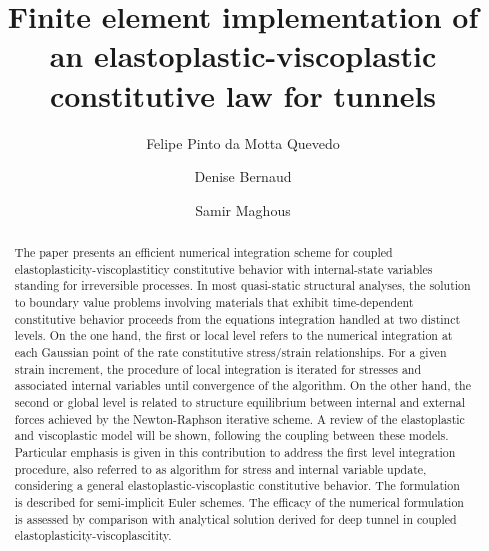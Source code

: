 \documentclass[Journal,letterpaper]{ascelike-new}
\begin{document}
\title{Finite element implementation of an elastoplastic-viscoplastic constitutive law for tunnels}

\author[1]{Felipe Pinto da Motta Quevedo}
\author[2]{Denise Bernaud}
\author[3]{Samir Maghous}


\maketitle

\begin{abstract}
The paper presents an efficient numerical integration scheme for coupled elastoplasticity-viscoplastiticy constitutive behavior with internal-state variables standing for irreversible processes. In most quasi-static structural analyses, the solution to boundary value problems involving materials that exhibit time-dependent constitutive behavior proceeds from the equations integration handled at two distinct levels. On the one hand, the first or local level refers to the numerical integration at each Gaussian point of the rate constitutive stress/strain relationships. For a given strain increment, the procedure of local integration is iterated for stresses and associated internal variables until convergence of the algorithm. On the other hand, the second or global level is related to structure equilibrium between internal and external forces achieved by the Newton-Raphson iterative scheme. A review of the elastoplastic and viscoplastic model will be shown, following the coupling between these models. Particular emphasis is given in this contribution to address the first level integration procedure, also referred to as algorithm for stress and internal variable update, considering a general elastoplastic-viscoplastic constitutive behavior. The formulation is described for semi-implicit Euler schemes. The efficacy of the numerical formulation is assessed by comparison with analytical solution derived for deep tunnel in coupled elastoplasticity-viscoplascitity.
\end{abstract}
\end{document}
